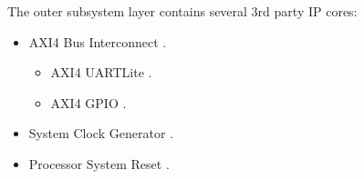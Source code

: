 

The outer subsystem layer contains several 3rd party IP cores:

\begin{itemize}
\item AXI4 Bus Interconnect \cite{SCARV:XILINX:AXI-IC}.

\begin{itemize}
\item AXI4 UARTLite \cite{SCARV:XILINX:UART-Lite}.
\item AXI4 GPIO \cite{SCARV:XILINX:GPIO}.
\end{itemize}

\item System Clock Generator \cite{SCARV:XILINX:ClockingWizard}.

\item Processor System Reset \cite{SCARV:XILINX:ProcessorReset}.

\end{itemize}
